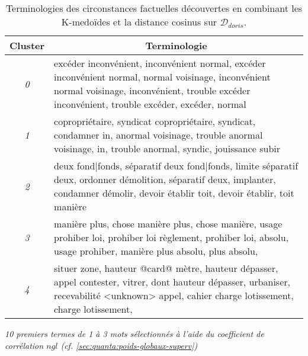 \begin{table}[ht]
	\centering \scriptsize
	\begin{tabular}{|c|p{}|}
		\hline
		\multicolumn{1}{|c|}{Cluster} & \multicolumn{1}{|c|}{Terminologie} \\ \hline
		\textit{0} & excéder inconvénient, inconvénient normal, excéder inconvénient normal, normal voisinage, inconvénient normal voisinage, inconvénient, trouble excéder inconvénient, trouble excéder, excéder, normal
		\\ \hline
		\textit{1} & copropriétaire, syndicat copropriétaire, syndicat, condamner in, anormal voisinage, trouble anormal voisinage, in, trouble anormal, syndic, jouissance subir
		\\ \hline
		\textit{2} & deux fond|fonds, séparatif deux fond|fonds, limite séparatif deux, ordonner démolition, séparatif deux, implanter, condamner démolir, devoir établir toit, devoir établir, toit manière
		\\ \hline
		\textit{3} & manière plus, chose manière plus, chose manière, usage prohiber loi, prohiber loi règlement, prohiber loi, absolu, usage prohiber, manière plus absolu, plus absolu, 
		\\ \hline
		\textit{4} & situer zone, hauteur @card@ mètre, hauteur dépasser, appel contester, vitrer, dont hauteur dépasser, urbaniser, recevabilité <unknown> appel, cahier charge lotissement, charge lotissement, 
		\\ \hline
	\end{tabular}
	
	\textit{10 premiers termes de 1 à 3 mots sélectionnés à l'aide du coefficient de corrélation $ngl$ (cf. \ref{sec:quanta:poids-globaux-superv})}
	\caption{Terminologies des circonstances factuelles découvertes en combinant les K-medoïdes et la distance cosinus sur $\mathcal{D}_{doris}$.}\label{tab:similarite:terminologie-clusters-doris}
\end{table}


